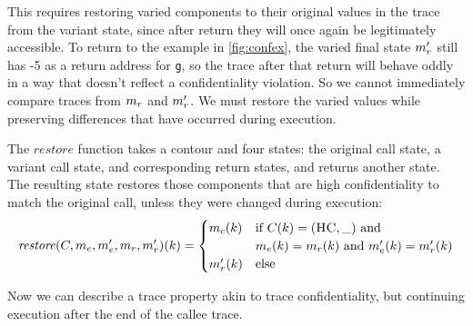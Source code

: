 \documentclass[acmsmall,review,anonymous]{acmart}\settopmatter{printfolios=true,printccs=false,printacmref=false}
\begin{document}
      This requires restoring varied components to their original values
      in the trace from the variant state, since after return they will
      once again be legitimately accessible. To return to the example in
      \cref{fig:confex}, the varied final state \(m_r'\) still has
      -5 as a return address for {\tt g}, so the trace after that return will
      behave oddly in a way that doesn't reflect a confidentiality violation.
      So we cannot immediately compare traces from \(m_r\) and
      \(m_r'\). We must restore the varied values while preserving
      differences that have occurred during execution.


      The \(\mathit{restore}\) function takes a contour and four states: the
      original call state, a variant call state, and corresponding return
      states, and returns another state. The resulting state restores those
      components that are high confidentiality to match the original call,
      unless they were changed during execution:
      \[\mathit{restore}(C,m_e,m_e',m_r,m_r')
        (k) =
        \begin{cases}
          m_c(k) & \text{if } C(k) = (\textsc{HC},\_)
            \text{ and } \\
          & m_e(k) = m_r(k) \text{ and }
            m_e'(k) = m_r'(k) \\
          m_r'(k) & \text{else} \\
        \end{cases}\]

      Now we can describe a trace property akin to trace confidentiality, but
      continuing execution after the end of the callee trace.
\end{document}

